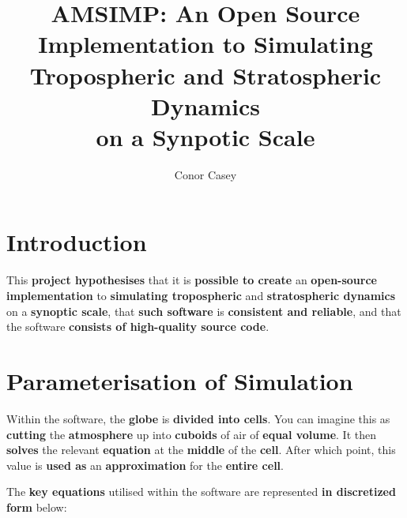 \documentclass[thesis]{poster_style}
\author{Conor Casey}
\title{AMSIMP: An Open Source Implementation to Simulating \\ Tropospheric and Stratospheric Dynamics \\ on a Synpotic Scale}
\begin{document}
\begin{poster}

\section{Introduction}
This \textbf{project hypothesises} that it is \textbf{possible to create} an
\textbf{open-source implementation} to \textbf{simulating tropospheric} and
\textbf{stratospheric dynamics} on a \textbf{synoptic scale}, that \textbf{such software}
is \textbf{consistent and reliable}, and that the software \textbf{consists of high-quality source code}.

\section{Parameterisation of Simulation}
Within the software, the \textbf{globe} is \textbf{divided into cells}. You can imagine
this as \textbf{cutting} the \textbf{atmosphere} up into \textbf{cuboids} of air of \textbf{equal volume}.
It then \textbf{solves} the relevant \textbf{equation} at the \textbf{middle} of the
\textbf{cell}. After which point, this value is \textbf{used as} an
\textbf{approximation} for the \textbf{entire cell}. 

\hfill

\begin{center}
\end{center}

The \textbf{key equations} utilised within the software are represented
\textbf{in discretized form} below:


\end{poster}
\end{document}
